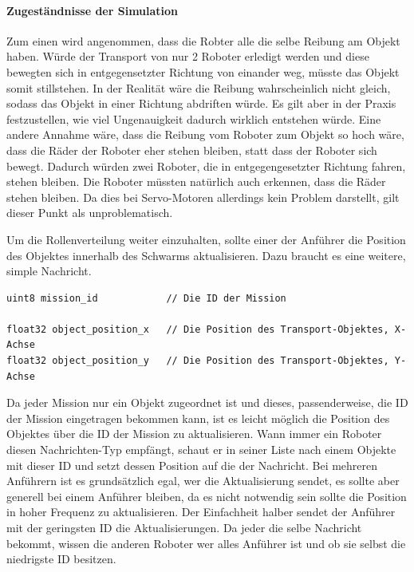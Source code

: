 \paragraph*{Zugeständnisse der Simulation}
Zum einen wird angenommen, dass die Robter alle die selbe Reibung am Objekt haben. Würde der Transport von nur 2 Roboter erledigt werden und diese bewegten sich in entgegensetzter Richtung von einander weg, müsste das Objekt somit stillstehen. In der Realität wäre die Reibung wahrscheinlich nicht gleich, sodass das Objekt in einer Richtung abdriften würde. Es gilt aber in der Praxis festzustellen, wie viel Ungenauigkeit dadurch wirklich entstehen würde.
Eine andere Annahme wäre, dass die Reibung vom Roboter zum Objekt so hoch wäre, dass die Räder der Roboter eher stehen bleiben, statt dass der Roboter sich bewegt. Dadurch würden zwei Roboter, die in entgegengesetzter Richtung fahren, stehen bleiben. Die Roboter müssten natürlich auch erkennen, dass die Räder stehen bleiben. Da dies bei Servo-Motoren allerdings kein Problem darstellt, gilt dieser Punkt als unproblematisch.

Um die Rollenverteilung weiter einzuhalten, sollte einer der Anführer die Position des Objektes innerhalb des Schwarms aktualisieren. Dazu braucht es eine weitere, simple Nachricht.

\begin{lstlisting}[style=ros, title=Nachrichten-Typ: Update\_Object]
uint8 mission_id			// Die ID der Mission

float32 object_position_x	// Die Position des Transport-Objektes, X-Achse
float32 object_position_y	// Die Position des Transport-Objektes, Y-Achse
\end{lstlisting}

Da jeder Mission nur ein Objekt zugeordnet ist und dieses, passenderweise, die ID der Mission eingetragen bekommen kann, ist es leicht möglich die Position des Objektes über die ID der Mission zu aktualisieren. Wann immer ein Roboter diesen Nachrichten-Typ empfängt, schaut er in seiner Liste nach einem Objekte mit dieser ID und setzt dessen Position auf die der Nachricht. Bei mehreren Anführern ist es grundsätzlich egal, wer die Aktualisierung sendet, es sollte aber generell bei einem Anführer bleiben, da es nicht notwendig sein sollte die Position in hoher Frequenz zu aktualisieren. Der Einfachheit halber sendet der Anführer mit der geringsten ID die Aktualisierungen. Da jeder die selbe Nachricht bekommt, wissen die anderen Roboter wer alles Anführer ist und ob sie selbst die niedrigste ID besitzen.

